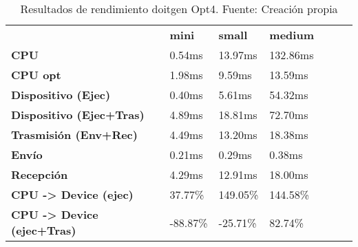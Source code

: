 \begin{table}[H]
    \centering
    \begin{tabular}{lllllll}
    \rowcolor[HTML]{DAE8FC} \ &  \textbf{mini} &  \textbf{	small} &  \textbf{	medium} \\
    \cellcolor[HTML]{DAE8FC} \textbf{CPU} & 0.54ms & 	13.97ms & 	132.86ms \\
    \rowcolor[HTML]{EFEFEF} \cellcolor[HTML]{DAE8FC} \textbf{CPU opt} & 1.98ms & 	9.59ms & 	13.59ms \\
    \cellcolor[HTML]{DAE8FC} \textbf{Dispositivo (Ejec)} & 0.40ms & 	5.61ms & 	54.32ms \\
    \rowcolor[HTML]{EFEFEF} \cellcolor[HTML]{DAE8FC} \textbf{Dispositivo (Ejec+Tras)} & 4.89ms & 	18.81ms & 	72.70ms \\
    \cellcolor[HTML]{DAE8FC} \textbf{Trasmisión (Env+Rec)} & 4.49ms & 	13.20ms & 	18.38ms \\
    \rowcolor[HTML]{EFEFEF} \cellcolor[HTML]{DAE8FC} \textbf{Envío} & 0.21ms & 	0.29ms & 	0.38ms \\
    \cellcolor[HTML]{DAE8FC} \textbf{Recepción} & 4.29ms & 	12.91ms & 	18.00ms \\
    \rowcolor[HTML]{EFEFEF} \cellcolor[HTML]{DAE8FC} \textbf{CPU -> Device (ejec)} & 37.77\% & 	149.05\% & 	144.58\% \\
    \cellcolor[HTML]{DAE8FC} \textbf{CPU -> Device (ejec+Tras)} & -88.87\% & 	-25.71\% & 	82.74\% \\
    \end{tabular}
    \caption[Resultados de rendimiento doitgen Opt4]{{Resultados de rendimiento doitgen Opt4. Fuente: Creación propia}}
    \label{table_test_doitgen_Opt4_hw_performanceResults}
\end{table}